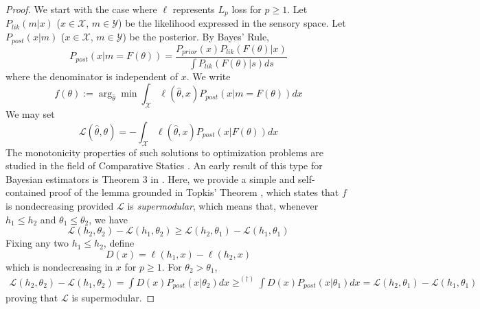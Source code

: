 \begin{proof}
    We start with the case where $\ell$ represents $L_p$ loss for $p \geq 1$.
    Let $P_{lik}(m|x)$ ($x \in \mathcal{X}$, $m\in\mathcal{Y}$) be the likelihood expressed in the sensory space.
    Let $P_{post}(x|m)$ ($x \in \mathcal{X}$, $m\in\mathcal{Y}$) be the posterior.
    By Bayes' Rule,
    \begin{equation}
        P_{post}(x|m=F(\theta)) = \frac{P_{prior}(x) P_{lik}(F(\theta) | x)}{\int P_{lik}(F(\theta) | s) ds}
    \end{equation}
    where the denominator is independent of $x$.
We write
\begin{equation}
        f(\theta) := \arg_{\widehat{\theta}}\min \int_{\mathcal{X}} \ell(\widehat{\theta}, x) P_{post}(x|m=F(\theta)) dx 
    \end{equation}
    We may set
    \begin{equation}
        \mathcal{L}(\widehat{\theta}, \theta) = -\int_{\mathcal{X}} \ell(\widehat{\theta}, x) P_{post}(x|F(\theta)) dx
    \end{equation}
The monotonicity properties of such solutions to optimization problems are studied in the field of Comparative Statics \citep{topkis1998supermodularity}.
An early result of this type for Bayesian estimators is Theorem 3 in \citet{karlin1956theory}.
Here, we provide a simple and self-contained proof of the lemma grounded in Topkis' Theorem \citep{topkis1978minimizing, topkis1998supermodularity,milgrom1994monotone}, which states that $f$ is nondecreasing provided $\mathcal{L}$ is \emph{supermodular}, 
    which means that, whenever $h_1 \leq h_2$ and $\theta_1 \leq \theta_2$, we have
    \begin{equation}
    \mathcal{L}(h_2,\theta_2)-\mathcal{L}(h_1,\theta_2) \geq \mathcal{L}(h_2,\theta_1)-\mathcal{L}(h_1,\theta_1)
    \end{equation}
    Fixing any two $h_1 \leq h_2$, define
    \begin{equation}
        D(x) = \ell(h_1,x) - \ell(h_2,x)
    \end{equation}
    which is nondecreasing in $x$ for $p\geq 1$.
    For $\theta_2 > \theta_1$,
\begin{align*}
    \mathcal{L}(h_2,\theta_2) - \mathcal{L}(h_1,\theta_2) = \int D(x) P_{post}(x|\theta_2) dx 
     \geq^{(\dagger)}  \int D(x) P_{post}(x|\theta_1) dx 
     =  \mathcal{L}(h_2,\theta_1) - \mathcal{L}(h_1,\theta_1)
\end{align*}
proving that $\mathcal{L}$ is supermodular.

\end{proof}
